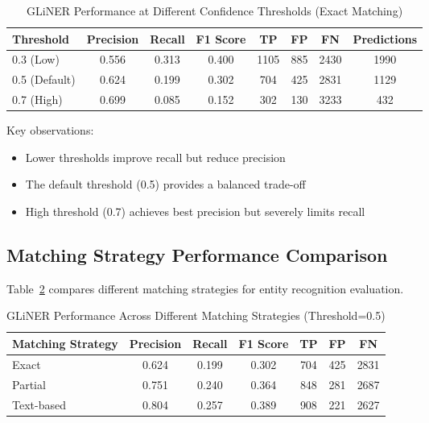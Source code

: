 \begin{table}[htbp]
\centering
\caption{GLiNER Performance at Different Confidence Thresholds (Exact Matching)}
\label{tab:gliner-threshold}
\begin{tabular}{lccccccc}
\toprule
\textbf{Threshold} & \textbf{Precision} & \textbf{Recall} & \textbf{F1 Score} & \textbf{TP} & \textbf{FP} & \textbf{FN} & \textbf{Predictions} \\
\midrule
0.3 (Low) & 0.556 & 0.313 & 0.400 & 1105 & 885 & 2430 & 1990 \\
0.5 (Default) & 0.624 & 0.199 & 0.302 & 704 & 425 & 2831 & 1129 \\
0.7 (High) & 0.699 & 0.085 & 0.152 & 302 & 130 & 3233 & 432 \\
\bottomrule
\end{tabular}
\end{table}

Key observations:
\begin{itemize}
    \item Lower thresholds improve recall but reduce precision
    \item The default threshold (0.5) provides a balanced trade-off
    \item High threshold (0.7) achieves best precision but severely limits recall
\end{itemize}

\subsection{Matching Strategy Performance Comparison}

Table~\ref{tab:matching-strategies} compares different matching strategies for entity recognition evaluation.

\begin{table}[htbp]
\centering
\caption{GLiNER Performance Across Different Matching Strategies (Threshold=0.5)}
\label{tab:matching-strategies}
\begin{tabular}{lcccccc}
\toprule
\textbf{Matching Strategy} & \textbf{Precision} & \textbf{Recall} & \textbf{F1 Score} & \textbf{TP} & \textbf{FP} & \textbf{FN} \\
\midrule
Exact & 0.624 & 0.199 & 0.302 & 704 & 425 & 2831 \\
Partial & 0.751 & 0.240 & 0.364 & 848 & 281 & 2687 \\
Text-based & 0.804 & 0.257 & 0.389 & 908 & 221 & 2627 \\
\bottomrule
\end{tabular}
\end{table}

